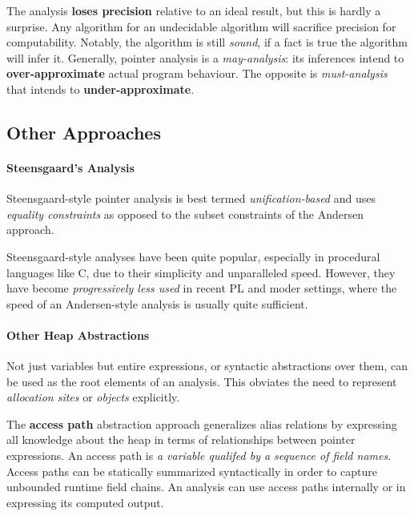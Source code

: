 The analysis \textbf{loses precision} relative to an ideal result, but
this is hardly a surprise. Any algorithm for an undecidable algorithm
will sacrifice precision for computability. Notably, the algorithm is
still \textit{sound}, if a fact is true the algorithm will infer
it. Generally, pointer analysis is a \textit{may-analysis}: its
inferences intend to \textbf{over-approximate} actual program
behaviour. The opposite is \textit{must-analysis} that intends to
\textbf{under-approximate}.




\subsection{Other Approaches}

\paragraph{Steensgaard's Analysis}

Steensgaard-style pointer analysis is best termed
\textit{unification-based} and uses \textit{equality constraints} as
opposed to the subset constraints of the Andersen approach.

Steensgaard-style analyses have been quite popular, especially in
procedural languages like C, due to their simplicity and unparalleled
speed. However, they have become \textit{progressively less used} in
recent PL and moder settings, where the speed of an Andersen-style
analysis is usually quite sufficient.



\paragraph{Other Heap Abstractions}

Not just variables but entire expressions, or syntactic abstractions
over them, can be used as the root elements of an analysis. This
obviates the need to represent \textit{allocation sites} or
\textit{objects} explicitly.

The \textbf{access path} abstraction approach generalizes alias
relations by expressing all knowledge about the heap in terms of
relationships between pointer expressions. An access path is \textit{a
  variable qualifed by a sequence of field names}. Access paths can be
statically summarized syntactically in order to capture unbounded
runtime field chains. An analysis can use access paths internally or
in expressing its computed output.
